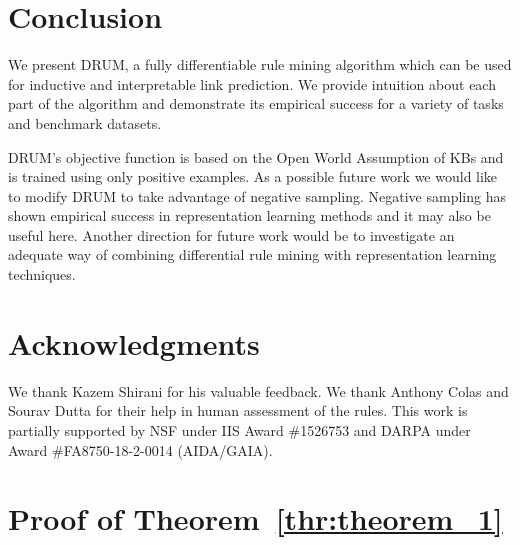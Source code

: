 \documentclass{article}
\begin{document}
\section{Conclusion}

We present DRUM, a fully differentiable rule mining algorithm which can be used for inductive and interpretable link prediction. We provide intuition about each part of the algorithm and demonstrate its empirical success for a variety of tasks and benchmark datasets.  

DRUM's objective function is based on the Open World Assumption of KBs and is trained using only positive examples. As a possible future work we would like to modify DRUM to take advantage of negative sampling. Negative sampling has shown empirical success in representation learning methods and it may also be useful here. Another direction for future work would be to investigate an adequate way of combining differential rule mining with representation learning techniques.


\section*{Acknowledgments}
We thank Kazem Shirani for his valuable feedback. We thank Anthony Colas and Sourav Dutta for their help in human assessment of the rules. This work is partially supported by NSF under IIS Award \#1526753 and DARPA under Award \#FA8750-18-2-0014 (AIDA/GAIA). 




\clearpage



\appendix
\appendixpage
\addappheadtotoc

\section{Proof of Theorem~\ref{thr:theorem_1}}
\end{document}
